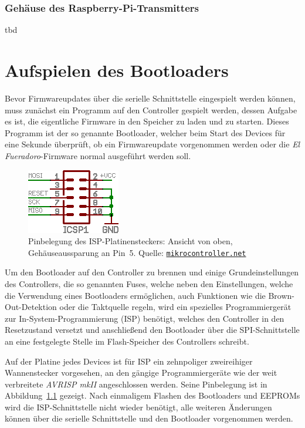 \documentclass[paper=a4, parskip, numbers=noenddot, toc=listof, headsepline]{scrbook}
\newcommand{\anlage}{\emph{El Fueradoro}}
\begin{document}
				\subsection{Gehäuse des Raspberry-Pi-Transmitters}

					tbd

		\chapter{Aufspielen des Bootloaders}
			\label{ch:bootloader}

			Bevor Firmwareupdates über die serielle Schnittstelle eingespielt werden können, muss zunächst ein Programm auf den Controller gespielt werden, dessen Aufgabe es ist, die eigentliche Firmware in den Speicher zu laden und zu starten. Dieses Programm ist der so genannte Bootloader, welcher beim Start des Devices für eine Sekunde überprüft, ob ein Firmwareupdate vorgenommen werden oder die {\anlage}-Firmware normal ausgeführt werden soll.

			\begin{figure}[!h]
				\centering
				\includegraphics[width=.35\textwidth]{Bilder/isp}
				\caption{Pinbelegung des ISP-Platinensteckers: Ansicht von oben, Gehäuseaussparung an Pin~5. Quelle: \href{http://www.mikrocontroller.net}{\texttt{mikrocontroller.net}}}
				\label{fig:isp}
			\end{figure}

			Um den Bootloader auf den Controller zu brennen und einige Grundeinstellungen des Controllers, die so genannten Fuses, welche neben den Einstellungen, welche die Verwendung eines Bootloaders ermöglichen, auch Funktionen wie die Brown-Out-Detektion oder die Taktquelle regeln, wird ein spezielles Programmiergerät zur In-System-Programmierung (ISP) benötigt, welches den Controller in den Resetzustand versetzt und anschließend den Bootloader über die SPI-Schnittstelle an eine festgelegte Stelle im Flash-Speicher des Controllers schreibt.

			Auf der Platine jedes Devices ist für ISP ein zehnpoliger zweireihiger Wannenstecker vorgesehen, an den gängige Programmiergeräte wie der weit verbreitete \emph{AVRISP mkII} angeschlossen werden. Seine Pinbelegung ist in Abbildung~\ref{fig:isp} gezeigt. Nach einmaligem Flashen des Bootloaders und EEPROMs wird die ISP-Schnittstelle nicht wieder benötigt, alle weiteren Änderungen können über die serielle Schnittstelle und den Bootloader vorgenommen werden.
\end{document}
